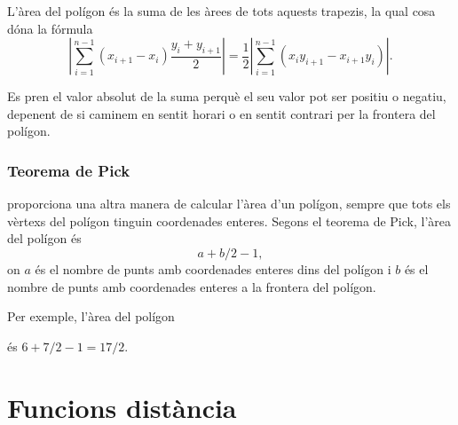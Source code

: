 L'àrea del polígon és la suma de les àrees de tots aquests trapezis,
la qual cosa dóna la fórmula \[|\sum_{i=1}^{n-1} (x_{i+1}-x_{i}) \frac{y_i+y_{i+1}}{2}| = \frac{1}{2} |\sum_{i=1}^{n-1} (x_i y_{i+1} - x_{i+1} y_i)|.\]

Es pren el valor absolut de la suma perquè el seu valor pot ser
positiu o negatiu, depenent de si caminem en sentit horari o en sentit
contrari per la frontera del polígon.

\subsubsection{Teorema de Pick}


 proporciona una altra manera de calcular
l'àrea d'un polígon, sempre que tots els vèrtexs del polígon tinguin
coordenades enteres. Segons el teorema de Pick, l'àrea del polígon és
\[ a + b/2 -1,\]
on $a$ és el nombre de punts amb coordenades enteres dins del polígon
i $b$ és el nombre de punts amb coordenades enteres a la frontera del
polígon.

Per exemple, l'àrea del polígon
\begin{center}
\end{center}
és $6+7/2-1=17/2$.

\section{Funcions distància}

